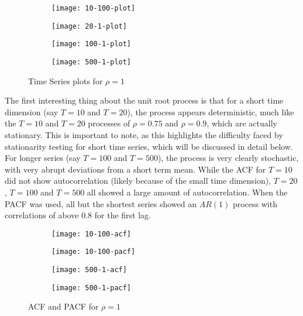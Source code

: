 \begin{figure}[htp]
	\centering
	\begin{subfigure}{0.23\textwidth}
		\centering
		\texttt{[image: 10-100-plot]}
	\end{subfigure}
	\begin{subfigure}{0.23\textwidth}
		\centering
		\texttt{[image: 20-1-plot]}
	\end{subfigure}
	\begin{subfigure}{0.23\textwidth}
		\centering
		\texttt{[image: 100-1-plot]}
	\end{subfigure}
	\begin{subfigure}{0.23\textwidth}
		\centering
		\texttt{[image: 500-1-plot]}
	\end{subfigure}
	\caption{Time Series plots for $\rho = 1$}
\end{figure}


The first interesting thing about the unit root process is that for a short time dimension (say $T = 10$ and $T = 20$), the process appears deterministic, much like the $T = 10$ and $T = 20$ processes of $\rho = 0.75$ and $\rho = 0.9$, which are actually stationary. This is important to note, as this highlights the difficulty faced by stationarity testing for short time series, which will be discussed in detail below. For longer series (say $T = 100$ and $T = 500$), the process is very clearly stochastic, with very abrupt deviations from a short term mean. While the ACF for $T = 10$ did not show autocorrelation (likely because of the small time dimension), $T = 20$, $T =100$ and $T = 500$ all showed a large amount of autocorrelation. When the PACF was used, all but the shortest series showed an $AR(1)$ process with correlations of above 0.8 for the first lag.

\begin{figure}[htp]
	\centering
	\begin{subfigure}{0.23\textwidth}
		\centering
		\texttt{[image: 10-100-acf]}
	\end{subfigure}
	\begin{subfigure}{0.23\textwidth}
		\centering
		\texttt{[image: 10-100-pacf]}
	\end{subfigure}
	\begin{subfigure}{0.23\textwidth}
		\centering
		\texttt{[image: 500-1-acf]}
	\end{subfigure}
	\begin{subfigure}{0.23\textwidth}
		\centering
		\texttt{[image: 500-1-pacf]}
	\end{subfigure}
	\caption{ACF and PACF for $\rho = 1$}
\end{figure}


